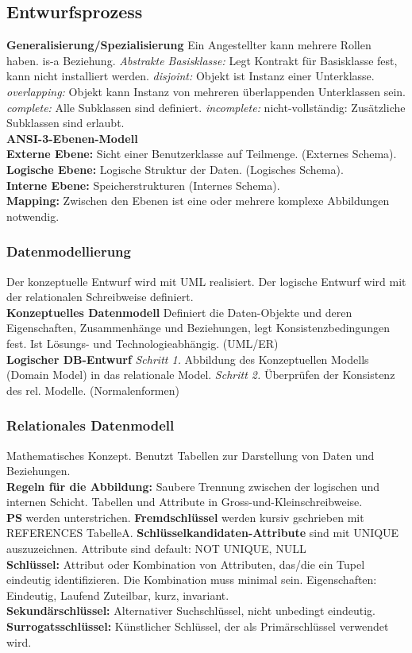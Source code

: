 \documentclass[7pt,landscape,a4paper]{scrartcl}
\begin{document}
\begin{multicols*}{4}
\subsection{Entwurfsprozess}
\textbf{Generalisierung/Spezialisierung} Ein Angestellter kann mehrere Rollen haben. is-a Beziehung. \textit{Abstrakte Basisklasse: } Legt Kontrakt für Basisklasse fest, kann nicht installiert werden. \textit{disjoint:} Objekt ist Instanz einer Unterklasse. \textit{overlapping:} Objekt kann Instanz von mehreren überlappenden Unterklassen sein. \textit{complete:} Alle Subklassen sind definiert. \textit{incomplete:} nicht-vollständig: Zusätzliche Subklassen sind erlaubt.\\
\textbf{ANSI-3-Ebenen-Modell}\\
\textbf{Externe Ebene:} Sicht einer Benutzerklasse auf Teilmenge. (Externes Schema). \\
\textbf{Logische Ebene:} Logische Struktur der Daten. (Logisches Schema). \\
\textbf{Interne Ebene:}  Speicherstrukturen (Internes Schema). \\
\textbf{Mapping:} Zwischen den Ebenen ist eine oder mehrere komplexe Abbildungen notwendig.
\subsubsection{Datenmodellierung}
Der konzeptuelle Entwurf wird mit UML realisiert. Der logische Entwurf wird mit der relationalen Schreibweise definiert.\\
\textbf{Konzeptuelles Datenmodell}
Definiert die Daten-Objekte und deren Eigenschaften, Zusammenhänge und Beziehungen, legt Konsistenzbedingungen fest. Ist Lösungs- und Technologieabhängig. (UML/ER)\\
\textbf{Logischer DB-Entwurf} \textit{Schritt 1.} Abbildung des Konzeptuellen Modells (Domain Model) in das relationale Model. \textit{Schritt 2.} Überprüfen der Konsistenz des rel. Modelle. (Normalenformen)
\subsubsection{Relationales Datenmodell}
Mathematisches Konzept. Benutzt Tabellen zur Darstellung von Daten und Beziehungen.\\
\textbf{Regeln für die Abbildung: }Saubere Trennung zwischen der logischen und internen Schicht. Tabellen und Attribute in Gross-und-Kleinschreibweise.\\
\textbf{PS} werden unterstrichen.  \textbf{Fremdschlüssel} werden kursiv gschrieben mit REFERENCES TabelleA. 
\textbf{Schlüsselkandidaten-Attribute} sind mit UNIQUE auszuzeichnen. Attribute sind default: NOT UNIQUE, NULL\\
 \textbf{Schlüssel:} Attribut oder Kombination von Attributen, das/die ein Tupel eindeutig identifizieren. Die Kombination muss minimal sein. Eigenschaften: Eindeutig, Laufend Zuteilbar, kurz, invariant.\\
\textbf{Sekundärschlüssel:} Alternativer Suchschlüssel, nicht unbedingt eindeutig. \\
\textbf{Surrogatsschlüssel:} Künstlicher Schlüssel, der als Primärschlüssel verwendet wird.

\end{multicols*}
\end{document}
